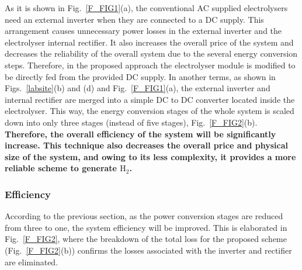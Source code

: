 \documentclass[1pt]{extarticle}
\begin{document}
As it is shown in Fig.~\ref{F_FIG1}(a), the conventional AC supplied electrolysers need an external inverter when they are connected to a DC supply. This arrangement causes unnecessary power losses in the external inverter and the electrolyser internal rectifier. It also increases the overall price of the system and decreases the reliability of the overall system due to the several energy conversion steps.
Therefore, in the proposed approach the electrolyser module is modified to be directly fed from the provided DC supply. In another terms, as shown in Figs.~\ref{labsite}(b) and (d) and Fig.~\ref{F_FIG1}(a), the external inverter and internal rectifier are merged into a simple DC to DC converter located inside the electrolyser. This way, the energy conversion stages of the whole system is scaled down into only three stages (instead of five stages), Fig.~\ref{F_FIG2}(b). \textbf{Therefore, the overall efficiency of the system will be significantly increase. This technique also decreases the overall price and physical size of the system, and owing to its less complexity, it provides a more reliable scheme to generate $\textrm{H}_2$.}  


\subsubsection{Efficiency}

According to the previous section, as the power conversion stages are reduced from three to one, the system efficiency will be improved. This is elaborated in Fig.~\ref{F_FIG2}, where the breakdown of the total loss for the proposed scheme (Fig.~\ref{F_FIG2}(b)) confirms the losses associated with the inverter and rectifier are eliminated. 
\end{document}

